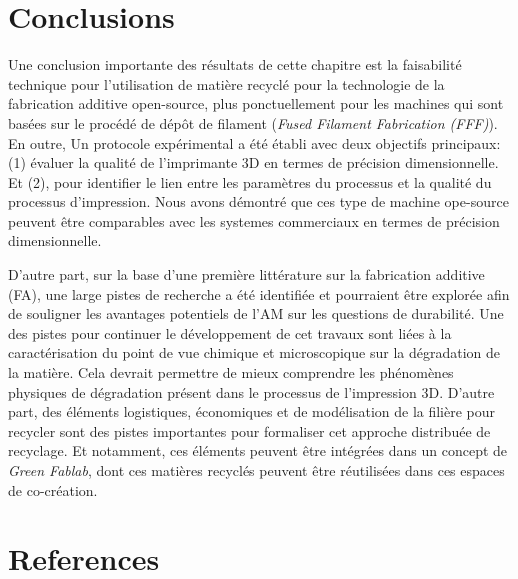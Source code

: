 \documentclass[
]{article}
\begin{document}
\hypertarget{conclusions}{%
\section{Conclusions}\label{conclusions}}

Une conclusion importante des résultats de cette chapitre est la
faisabilité technique pour l'utilisation de matière recyclé pour la
technologie de la fabrication additive open-source, plus ponctuellement
pour les machines qui sont basées sur le procédé de dépôt de filament
(\emph{Fused Filament Fabrication (FFF)}). En outre, Un protocole
expérimental a été établi avec deux objectifs principaux: (1) évaluer la
qualité de l'imprimante 3D en termes de précision dimensionnelle. Et
(2), pour identifier le lien entre les paramètres du processus et la
qualité du processus d'impression. Nous avons démontré que ces type de
machine ope-source peuvent être comparables avec les systemes
commerciaux en termes de précision dimensionnelle.

D'autre part, sur la base d'une première littérature sur la fabrication
additive (FA), une large pistes de recherche a été identifiée et
pourraient être explorée afin de souligner les avantages potentiels de
l'AM sur les questions de durabilité. Une des pistes pour continuer le
développement de cet travaux sont liées à la caractérisation du point de
vue chimique et microscopique sur la dégradation de la matière. Cela
devrait permettre de mieux comprendre les phénomènes physiques de
dégradation présent dans le processus de l'impression 3D. D'autre part,
des éléments logistiques, économiques et de modélisation de la filière
pour recycler sont des pistes importantes pour formaliser cet approche
distribuée de recyclage. Et notamment, ces éléments peuvent être
intégrées dans un concept de \emph{Green Fablab}, dont ces matières
recyclés peuvent être réutilisées dans ces espaces de co-création.

\hypertarget{references}{%
\section*{References}\label{references}}
\end{document}
